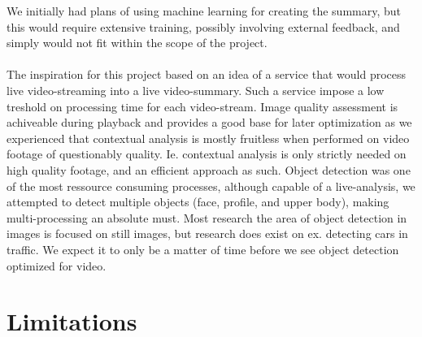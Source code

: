 We initially had plans of using machine learning for creating the summary, but this would require extensive training, possibly involving external feedback, and simply would not fit within the scope of the project.
\\\\
The inspiration for this project based on an idea of a service that would process live video-streaming into a live video-summary. Such a service impose a low treshold on processing time for each video-stream. Image quality assessment is achiveable during playback and provides a good base for later optimization as we experienced that contextual analysis is mostly fruitless when performed on video footage of questionably quality. Ie. contextual analysis is only strictly needed on high quality footage, and an efficient approach as such. Object detection was one of the most ressource consuming processes, although capable of a live-analysis, we attempted to detect multiple objects (face, profile, and upper body), making multi-processing an absolute must. Most research the area of object detection in images is focused on still images, but research does exist on ex. detecting cars in traffic. We expect it to only be a matter of time before we see object detection optimized for video.

%
\section{Limitations}\label{sec:conc_lims}
%
